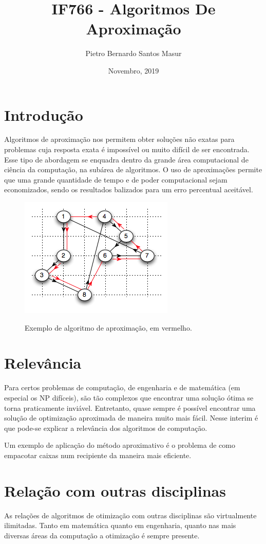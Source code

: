 \documentclass{article}
\title{IF766 - Algoritmos De Aproximação}
\author{Pietro Bernardo Santos Masur}
\date{Novembro, 2019}
\begin{document}
\maketitle

\section{Introdução}
Algoritmos de aproximação nos permitem obter soluções não exatas para problemas cuja resposta exata é impossível ou muito difícil de ser encontrada. Esse tipo de abordagem se enquadra dentro da grande área computacional de ciência da computação, na subárea de algoritmos. O uso de aproximações permite que uma grande quantidade de tempo e de poder computacional sejam economizados, sendo os resultados balizados para um erro percentual aceitável.
\begin{figure}[h!]
\centering
\includegraphics[scale=0.8]{pbsm.png}
\caption{Exemplo de algoritmo de aproximação, em vermelho.}\cite{Algoritmo}
\label{fig:Exemplo algoritmo}
\end{figure}

\section{Relevância}
\par
Para certos problemas de computação, de engenharia e de matemática (em especial os NP difíceis), são tão complexos que encontrar uma solução ótima se torna praticamente inviável. Entretanto, quase sempre é possível encontrar uma solução de optimização aproximada de maneira muito mais fácil. Nesse interim é que pode-se explicar a relevância dos algoritmos de computação.
\par
Um exemplo de aplicação do método aproximativo é o problema de como empacotar caixas num recipiente da maneira mais eficiente.\citep{VANSTEE2004535}
\section{Relação com outras disciplinas}
\par
As relações de algoritmos de otimização com outras disciplinas são virtualmente ilimitadas. Tanto em matemática quanto em engenharia, quanto nas mais diversas áreas da computação a otimização é sempre presente.\citep{wikipedia}



\end{document}
